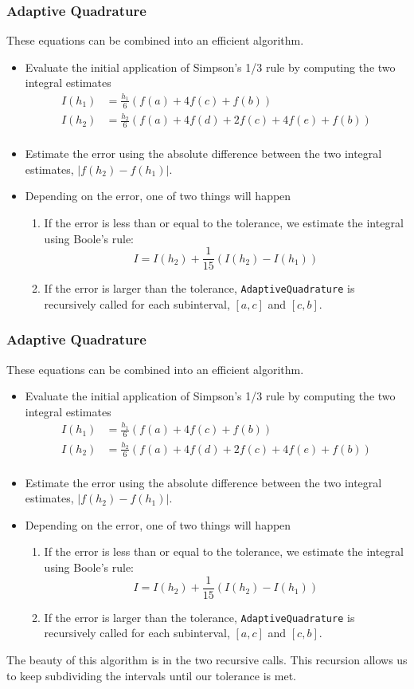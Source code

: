 \documentclass{if-beamer}
\begin{document}
\begin{frame}[t]
	\frametitle{Adaptive Quadrature}
	These equations can be combined into an efficient algorithm.
	\begin{itemize}
		\item Evaluate the initial application of Simpson's 1/3 rule by computing the two integral estimates
		\begin{align*}
			I(h_1) &= \frac{h_1}{6}(f(a) + 4f(c) + f(b))\\
			I(h_2) &=\frac{h_2}{6}(f(a) +4f(d) +2f(c) +4f(e) +f(b))\\
		\end{align*}
		\item Estimate the error using the absolute difference between the two integral estimates, $|f(h_2)-f(h_1)|$.
		\item Depending on the error, one of two things will happen
		\begin{enumerate}
			\item If the error is less than or equal to the tolerance, we estimate the integral using Boole's rule:
			$$I = I(h_2) +\frac{1}{15}\left(I(h_2) -I(h_1)\right)$$
			\item If the error is larger than the tolerance, \texttt{AdaptiveQuadrature} is recursively called for each subinterval, $[a,c]$ and $[c,b]$. 
		\end{enumerate} 
	\end{itemize}
\end{frame}

\begin{frame}[t]
	\frametitle{Adaptive Quadrature}
	These equations can be combined into an efficient algorithm.
	\begin{itemize}
		\item Evaluate the initial application of Simpson's 1/3 rule by computing the two integral estimates
		\begin{align*}
			I(h_1) &= \frac{h_1}{6}(f(a) + 4f(c) + f(b))\\
			I(h_2) &=\frac{h_2}{6}(f(a) +4f(d) +2f(c) +4f(e) +f(b))\\
		\end{align*}
		\item Estimate the error using the absolute difference between the two integral estimates, $|f(h_2)-f(h_1)|$.
		\item Depending on the error, one of two things will happen
		\begin{enumerate}
			\item If the error is less than or equal to the tolerance, we estimate the integral using Boole's rule:
			$$I = I(h_2) +\frac{1}{15}\left(I(h_2) -I(h_1)\right)$$
			\item If the error is larger than the tolerance, \texttt{AdaptiveQuadrature} is recursively called for each subinterval, $[a,c]$ and $[c,b]$. 
		\end{enumerate} 
	\end{itemize}
	The beauty of this algorithm is in the two recursive calls. This recursion allows us to keep subdividing the intervals until our tolerance is met.
\end{frame}
\end{document}
